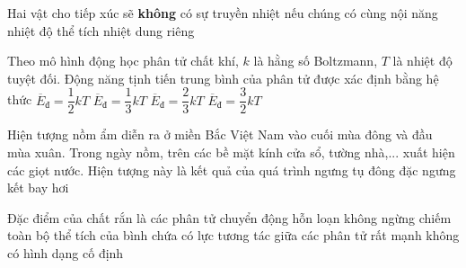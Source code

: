 	\begin{ex}%
		Hai vật cho tiếp xúc sẽ \textbf{không} có sự truyền nhiệt nếu chúng có cùng
		\choice
		{nội năng}
		{\True nhiệt độ}
		{thể tích}
		{nhiệt dung riêng}
	\end{ex}

	\begin{ex}%
		Theo mô hình động học phân tử chất khí, $k$ là hằng số Boltzmann, $T$ là nhiệt độ tuyệt đối. Động năng tịnh tiến trung bình của phân tử được xác định bằng hệ thức
		\choice
		{$\overline{E}_{\text{đ}}=\dfrac{1}{2}kT$}
		{$\overline{E}_{\text{đ}}=\dfrac{1}{3}kT$}
		{$\overline{E}_{\text{đ}}=\dfrac{2}{3}kT$}
		{\True $\overline{E}_{\text{đ}}=\dfrac{3}{2}kT$}
	\end{ex}

	\begin{ex}%
		Hiện tượng nồm ẩm diễn ra ở miền Bắc Việt Nam vào cuối mùa đông và đầu mùa xuân. Trong ngày nồm, trên các bề mặt kính cửa sổ, tường nhà,... xuất hiện các giọt nước. Hiện tượng này là kết quả của quá trình
		\choice
		{\True ngưng tụ}
		{đông đặc}
		{ngưng kết}
		{bay hơi}
	\end{ex}

	\begin{ex}%
		Đặc điểm của chất rắn là
		\choice
		{các phân tử chuyển động hỗn loạn không ngừng}
		{chiếm toàn bộ thể tích của bình chứa}
		{\True có lực tương tác giữa các phân tử rất mạnh}
		{không có hình dạng cố định}
	\end{ex}

